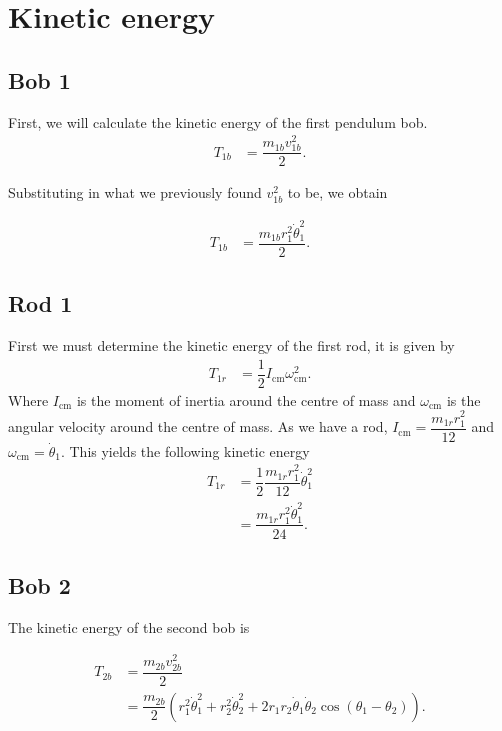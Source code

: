 \documentclass[12pt,a4paper,portrait]{article}
\begin{document}
	\section{Kinetic energy}
	
	\subsection{Bob 1}
	First, we will calculate the kinetic energy of the first pendulum bob. 
	\begin{align*}
		T_{1b} &= \dfrac{m_{1b}v_{1b}^2}{2}.
	\end{align*}
	
	Substituting in what we previously found $v_{1b}^2$ to be, we obtain
	
	\begin{align*}
		T_{1b} &= \dfrac{m_{1b} r_1^2 \dot{\theta}_1^2}{2}.
	\end{align*}
	\subsection{Rod 1}
	First we must determine the kinetic energy of the first rod, it is given by
	\begin{align*}
		T_{1r} &= \dfrac{1}{2} I_{\mathrm{cm}} \omega_{\mathrm{cm}}^2.
	\end{align*}
	Where $I_{\mathrm{cm}}$ is the moment of inertia around the centre of mass and $\omega_{\mathrm{cm}}$ is the angular velocity around the centre of mass. As we have a rod, $I_{\mathrm{cm}} = \dfrac{m_{1r}r_1^2}{12}$ and $\omega_{\mathrm{cm}} = \dot{\theta}_1$. This yields the following kinetic energy
	\begin{align*}
		T_{1r} &= \dfrac{1}{2}\dfrac{m_{1r} r_1^2}{12}\dot{\theta}_1^2 \\
		&= \dfrac{m_{1r} r_1^2\dot{\theta}_1^2}{24}.
	\end{align*}
	
	\subsection{Bob 2}
	The kinetic energy of the second bob is
	
	\begin{align*}
		T_{2b} &= \dfrac{m_{2b} v_{2b}^2}{2} \\
		&= \dfrac{m_{2b}}{2} \left(r_1^2 \dot{\theta}_1^2 + r_2^2 \dot{\theta}_2^2 + 2r_1 r_2 \dot{\theta}_1 \dot{\theta}_2 \cos{\left(\theta_1-\theta_2\right)}\right).
	\end{align*}
	
\end{document}
